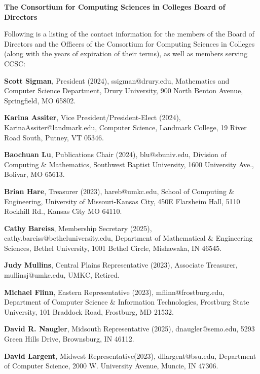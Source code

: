\documentclass{article}
\begin{document}
\begingroup
  \centering
  \textbf{\large The Consortium for Computing Sciences in Colleges Board of Directors\\}
\endgroup

\begin{multicols}{2}
\begin{raggedright}

\small{

\noindent
Following is a listing of the contact information for the members of the Board
of Directors and the Officers of the Consortium for Computing Sciences in
Colleges (along with the years of expiration of their terms), as well as members
serving CCSC:

\noindent
\textbf{Scott Sigman}, President (2024), ssigman@drury.edu,
Mathematics and Computer Science Department, Drury University, 900 North Benton Avenue, Springfield, MO 65802.

\noindent
\textbf{Karina Assiter}, Vice President/President-Elect (2024), KarinaAssiter@landmark.edu,
Computer Science, Landmark College,
19 River Road South, Putney, VT 05346.

\noindent
\textbf{Baochuan Lu}, Publications Chair (2024),
blu@sbuniv.edu, Division of Computing \& Mathematics, Southwest Baptist University, 1600 University Ave., Bolivar, MO 65613.

\noindent
\textbf{Brian Hare}, Treasurer (2023), hareb@umkc.edu,
School of Computing \& Engineering, University of Missouri-Kansas City, 450E
Flarsheim Hall, 5110 Rockhill Rd., Kansas City MO 64110.

\noindent
\textbf{Cathy Bareiss}, Membership Secretary (2025), cathy.bareiss@betheluniversity.edu,
Department of Mathematical \& Engineering Sciences, Bethel University,
1001 Bethel Circle, Mishawaka, IN 46545.

\noindent
\textbf{Judy Mullins}, Central Plains Representative (2023), Associate Treasurer,
mullinsj@umkc.edu, UMKC, Retired.

\noindent
\textbf{Michael Flinn}, Eastern Representative (2023), mflinn@frostburg.edu,
Department of Computer Science \& Information Technologies,
Frostburg State University, 101 Braddock Road, Frostburg, MD 21532.

\noindent
\textbf{David R. Naugler}, Midsouth Representative (2025),
dnaugler@semo.edu, 5293 Green Hills Drive, Brownsburg, IN 46112.

\noindent
\textbf{David Largent}, Midwest Representative(2023), dllargent@bsu.edu,
Department of Computer Science,
2000 W. University Avenue,
Muncie, IN 47306.

}
\end{raggedright}
\end{multicols}
\end{document}

